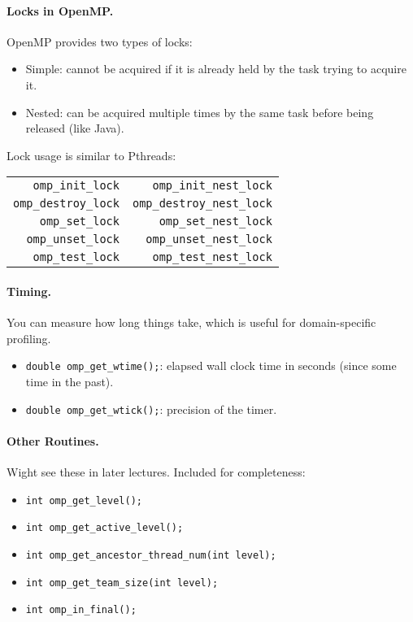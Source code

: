 \paragraph{Locks in OpenMP.}
OpenMP provides two types of locks:
 
  \begin{itemize}
    \item Simple: cannot be acquired if it is already held by the task trying to acquire it.
    \item Nested: can be acquired multiple times by the same task before being released (like Java).
  \end{itemize}

 Lock usage is similar to Pthreads:

  \begin{center}
    \begin{tabular}{r | r}
      {\tt omp\_init\_lock} & {\tt omp\_init\_nest\_lock}\\
      {\tt omp\_destroy\_lock} & {\tt omp\_destroy\_nest\_lock}\\
      {\tt omp\_set\_lock} & {\tt omp\_set\_nest\_lock}\\
      {\tt omp\_unset\_lock} & {\tt omp\_unset\_nest\_lock}\\
      {\tt omp\_test\_lock} & {\tt omp\_test\_nest\_lock}\\
    \end{tabular}
  \end{center}

\paragraph{Timing.} You can measure how long things take, which is useful for domain-specific
profiling.

  \begin{itemize}
    \item {\tt double omp\_get\_wtime();}: elapsed wall clock time in seconds (since some time in the past).
    \item {\tt double omp\_get\_wtick();}: precision of the timer.
  \end{itemize}

\paragraph{Other Routines.}
Wight see these in later lectures. Included for
  completeness:

  \begin{itemize}
    \item {\tt int omp\_get\_level();}
    \item {\tt int omp\_get\_active\_level();}
    \item {\tt int omp\_get\_ancestor\_thread\_num(int level);}
    \item {\tt int omp\_get\_team\_size(int level);}
    \item {\tt int omp\_in\_final();}
  \end{itemize}

